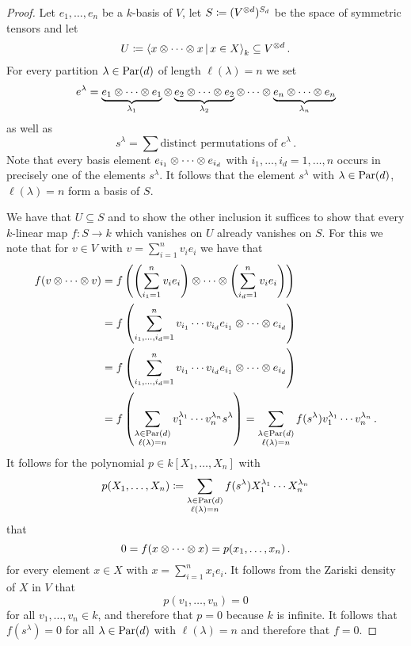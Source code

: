 \begin{proof}
  Let $e_1, \dotsc, e_n$ be a $k$-basis of $V$, let $S \coloneqq (V^{\mathbin{\otimes} d})^{S_d}$ be the space of symmetric tensors and let
  \[
              U
    \defined \gen{ x \tensor \dotsb \tensor x \suchthat x \in X }_k
    \subseteq V^{\tensor d} \,.
  \]
  For every partition $\lambda \in \operatorname{Par}(d)$ of length $\ell(\lambda) = n$ we set
  \[
      e^\lambda
    =         \underbrace{e_1 \mathbin{\otimes} \dotsb \mathbin{\otimes} e_1}_{\lambda_1}
      \mathbin{\otimes} \underbrace{e_2 \mathbin{\otimes} \dotsb \mathbin{\otimes} e_2}_{\lambda_2}
      \mathbin{\otimes} \dotsb
      \mathbin{\otimes} \underbrace{e_n \mathbin{\otimes} \dotsb \mathbin{\otimes} e_n}_{\lambda_n}
  \]
  as well as
  \[
      s^\lambda
    = \sum \text{distinct permutations of $e^\lambda$} \,.
  \]
  Note that every basis element $e_{i_1} \mathbin{\otimes} \dotsb \mathbin{\otimes} e_{i_d}$ with $i_1, \dotsc, i_d = 1, \dotsc, n$ occurs in precisely one of the elements $s^\lambda$.
  It follows that the element $s^\lambda$ with $\lambda \in \operatorname{Par}(d)$, $\ell(\lambda) = n$ form a basis of $S$.
  
  We have that $U \subseteq S$ and to show the other inclusion it suffices to show that every $k$-linear map $f \colon S \to k$ which vanishes on $U$ already vanishes on $S$.
  For this we note that for $v \in V$ with $v = \sum_{i=1}^n v_i e_i$ we have that
  \begin{align*}
        f(v \mathbin{\otimes} \dotsb \mathbin{\otimes} v)
    &=  f\left(
          \left( \sum_{i_1=1}^n v_i e_i \right)
          \mathbin{\otimes} \dotsb \mathbin{\otimes}
          \left( \sum_{i_d=1}^n v_i e_i \right)
        \right)
    \\
    &=  f\left(
          \sum_{i_1, \dotsc, i_d = 1}^n
          v_{i_1} \dotsm v_{i_d}
          e_{i_1} \mathbin{\otimes} \dotsb \mathbin{\otimes} e_{i_d}
        \right)
    \\
    &=  f\left(
          \sum_{i_1, \dotsc, i_d = 1}^n
          v_{i_1} \dotsm v_{i_d}
          e_{i_1} \mathbin{\otimes} \dotsb \mathbin{\otimes} e_{i_d}
        \right)
    \\
    &=  f\left(
          \sum_{\substack{\lambda \in \operatorname{Par}(d) \\ \ell(\lambda) = n}}
          v_1^{\lambda_1} \dotsm v_n^{\lambda _n}
          s^\lambda
        \right)
     =  \sum_{\substack{\lambda \in \operatorname{Par}(d) \\ \ell(\lambda) = n}}
        f(s^\lambda)
        v_1^{\lambda_1} \dotsm v_n^{\lambda _n} \,.
  \end{align*}
  It follows for the polynomial $p \in k[X_1, \dotsc, X_n]$ with
  \[
              p(X_1, \dotsc, X_n)
    \coloneqq  \sum_{\substack{\lambda \in \operatorname{Par}(d) \\ \ell(\lambda) = n}}
              f( s^\lambda )
              X_1^{\lambda_1} \dotsm X_n^{\lambda_n}
  \]
  that
  \[
      0
    = f(x \mathbin{\otimes} \dotsb \mathbin{\otimes} x)
    = p(x_1, \dotsc, x_n) \,.
  \]
  for every element $x \in X$ with $x = \sum_{i=1}^n x_i e_i$.
  It follows from the Zariski density of $X$ in $V$ that
  \[
      p(v_1, \dotsc, v_n)
    = 0
  \]
  for all $v_1, \dotsc, v_n \in k$, and therefore that $p = 0$ because $k$ is infinite.
  It follows that $f(s^\lambda) = 0$ for all $\lambda \in \operatorname{Par}(d)$ with $\ell(\lambda) = n$ and therefore that $f = 0$.
\end{proof}


